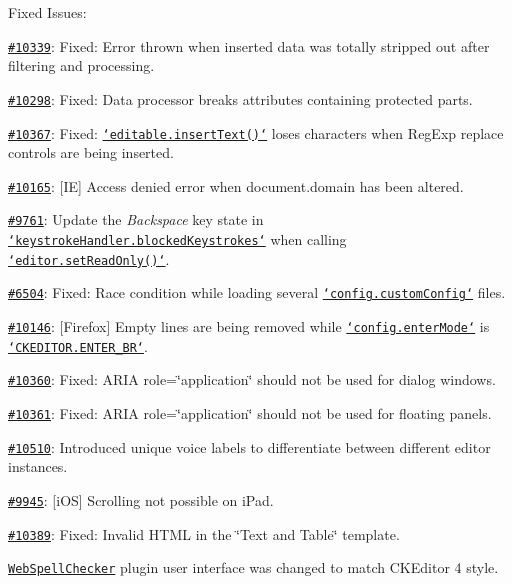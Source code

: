 Fixed Issues\-:
\begin{DoxyItemize}
\item \href{http://dev.ckeditor.com/ticket/10339}{\tt \#10339}\-: Fixed\-: Error thrown when inserted data was totally stripped out after filtering and processing.
\item \href{http://dev.ckeditor.com/ticket/10298}{\tt \#10298}\-: Fixed\-: Data processor breaks attributes containing protected parts.
\item \href{http://dev.ckeditor.com/ticket/10367}{\tt \#10367}\-: Fixed\-: \href{http://docs.ckeditor.com/#!/api/CKEDITOR.editable-method-insertText}{\tt `editable.insert\-Text()`} loses characters when {\ttfamily Reg\-Exp} replace controls are being inserted.
\item \href{http://dev.ckeditor.com/ticket/10165}{\tt \#10165}\-: \mbox{[}I\-E\mbox{]} Access denied error when {\ttfamily document.\-domain} has been altered.
\item \href{http://dev.ckeditor.com/ticket/9761}{\tt \#9761}\-: Update the {\itshape Backspace} key state in \href{http://docs.ckeditor.com/#!/api/CKEDITOR.keystrokeHandler-property-blockedKeystrokes}{\tt `keystroke\-Handler.blocked\-Keystrokes`} when calling \href{http://docs.ckeditor.com/#!/api/CKEDITOR.editor-method-setReadOnly}{\tt `editor.set\-Read\-Only()`}.
\item \href{http://dev.ckeditor.com/ticket/6504}{\tt \#6504}\-: Fixed\-: Race condition while loading several \href{http://docs.ckeditor.com/#!/api/CKEDITOR.config-cfg-customConfig}{\tt `config.custom\-Config`} files.
\item \href{http://dev.ckeditor.com/ticket/10146}{\tt \#10146}\-: \mbox{[}Firefox\mbox{]} Empty lines are being removed while \href{http://docs.ckeditor.com/#!/api/CKEDITOR.config-cfg-enterMode}{\tt `config.enter\-Mode`} is \href{http://docs.ckeditor.com/#!/api/CKEDITOR-property-ENTER_BR}{\tt `\-C\-K\-E\-D\-I\-T\-O\-R.E\-N\-T\-E\-R\-\_\-\-B\-R`}.
\item \href{http://dev.ckeditor.com/ticket/10360}{\tt \#10360}\-: Fixed\-: A\-R\-I\-A {\ttfamily role=\char`\"{}application\char`\"{}} should not be used for dialog windows.
\item \href{http://dev.ckeditor.com/ticket/10361}{\tt \#10361}\-: Fixed\-: A\-R\-I\-A {\ttfamily role=\char`\"{}application\char`\"{}} should not be used for floating panels.
\item \href{http://dev.ckeditor.com/ticket/10510}{\tt \#10510}\-: Introduced unique voice labels to differentiate between different editor instances.
\item \href{http://dev.ckeditor.com/ticket/9945}{\tt \#9945}\-: \mbox{[}i\-O\-S\mbox{]} Scrolling not possible on i\-Pad.
\item \href{http://dev.ckeditor.com/ticket/10389}{\tt \#10389}\-: Fixed\-: Invalid H\-T\-M\-L in the \char`\"{}\-Text and Table\char`\"{} template.
\item \href{http://ckeditor.com/addon/wsc}{\tt Web\-Spell\-Checker} plugin user interface was changed to match C\-K\-Editor 4 style.
\end{DoxyItemize}

